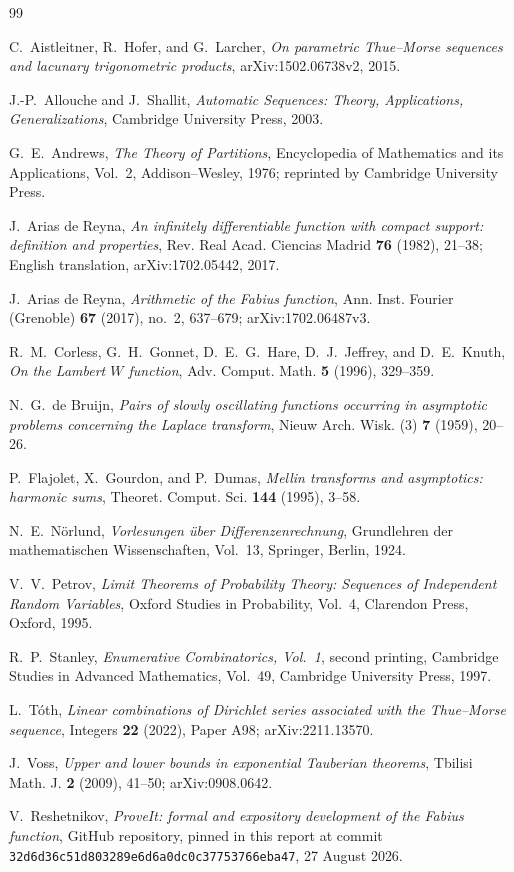 \documentclass[11pt,oneside]{article}
\numberwithin{equation}{section}
\theoremstyle{definition}
\theoremstyle{remark}
\begin{document}
\begin{thebibliography}{99}

C.~Aistleitner, R.~Hofer, and G.~Larcher,
\emph{On parametric Thue--Morse sequences and lacunary trigonometric products},
arXiv:1502.06738v2, 2015.

J.-P.~Allouche and J.~Shallit,
\emph{Automatic Sequences: Theory, Applications, Generalizations},
Cambridge University Press, 2003.

G.~E.~Andrews,
\emph{The Theory of Partitions},
Encyclopedia of Mathematics and its Applications, Vol.~2,
Addison--Wesley, 1976; reprinted by Cambridge University Press.

J.~Arias de Reyna,
\emph{An infinitely differentiable function with compact support: definition and
properties}, Rev. Real Acad. Ciencias Madrid \textbf{76} (1982), 21--38;
English translation, arXiv:1702.05442, 2017.

J.~Arias de Reyna,
\emph{Arithmetic of the Fabius function},
Ann. Inst. Fourier (Grenoble) \textbf{67} (2017), no.~2, 637--679;
arXiv:1702.06487v3.

R.~M.~Corless, G.~H.~Gonnet, D.~E.~G.~Hare, D.~J.~Jeffrey, and D.~E.~Knuth,
\emph{On the Lambert $W$ function},
Adv. Comput. Math. \textbf{5} (1996), 329--359.

N.~G.~de Bruijn,
\emph{Pairs of slowly oscillating functions occurring in asymptotic problems concerning
the Laplace transform},
Nieuw Arch. Wisk. (3) \textbf{7} (1959), 20--26.

P.~Flajolet, X.~Gourdon, and P.~Dumas,
\emph{Mellin transforms and asymptotics: harmonic sums},
Theoret. Comput. Sci. \textbf{144} (1995), 3--58.

N.~E.~N\"orlund,
\emph{Vorlesungen \"uber Differenzenrechnung},
Grundlehren der mathematischen Wissenschaften, Vol.~13,
Springer, Berlin, 1924.

V.~V.~Petrov,
\emph{Limit Theorems of Probability Theory: Sequences of Independent Random Variables},
Oxford Studies in Probability, Vol.~4, Clarendon Press, Oxford, 1995.

R.~P.~Stanley,
\emph{Enumerative Combinatorics, Vol.~1}, second printing,
Cambridge Studies in Advanced Mathematics, Vol.~49,
Cambridge University Press, 1997.

L.~T\'oth,
\emph{Linear combinations of Dirichlet series associated with the Thue--Morse sequence},
Integers \textbf{22} (2022), Paper A98; arXiv:2211.13570.

J.~Voss,
\emph{Upper and lower bounds in exponential Tauberian theorems},
Tbilisi Math. J. \textbf{2} (2009), 41--50; arXiv:0908.0642.

V.~Reshetnikov,
\emph{ProveIt: formal and expository development of the Fabius function},
GitHub repository, pinned in this report at commit
\texttt{32d6d36c51d803289e6d6a0dc0c37753766eba47}, 27 August 2026.

\end{thebibliography}
\end{document}
